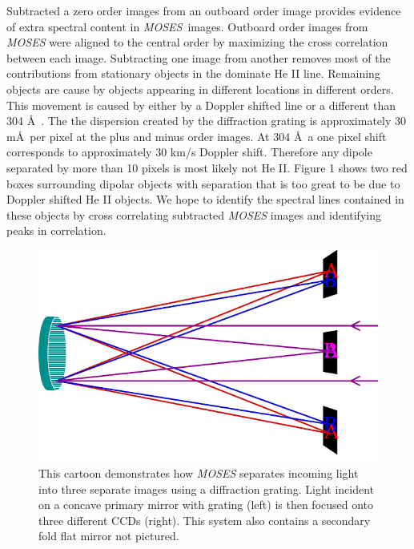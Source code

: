\documentclass[]{aastex6}
\newcommand{\MOSES}{\textit{MOSES}}
\begin{document}
Subtracted a zero order images from an outboard order image provides evidence of extra spectral content in \MOSES \ images. Outboard order images from \textit{MOSES} were aligned to the central order by maximizing the cross correlation between each image. Subtracting one image from another removes most of the contributions from stationary objects in the dominate He II line. Remaining objects are cause by objects appearing in different locations in different orders.  This movement is caused by either by a Doppler shifted line or a different  than 304 \AA \ .  The the dispersion created by the diffraction grating is approximately 30 m\AA \ per pixel at the plus and minus order images.  At 304 \AA \ a one pixel shift corresponds to approximately 30 km/s Doppler shift.  Therefore any dipole separated by more than 10 pixels is most likely not He II. Figure 1 shows two red boxes surrounding dipolar objects with separation that is too great to be due to Doppler shifted He II objects.  We hope to identify the spectral lines contained in these objects by cross correlating subtracted \textit{MOSES} images and identifying peaks in correlation.

\begin{figure}[t]
\centering
\includegraphics[scale=.5]{images/instrument.png}
\caption{This cartoon demonstrates how \textit{MOSES} separates incoming light into three separate images using a diffraction grating. Light incident on a concave primary mirror with grating (left) is then focused onto three different CCDs (right). This system also contains a secondary fold flat mirror not pictured.} 
\end{figure}
\end{document}
